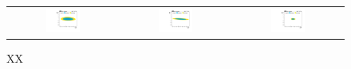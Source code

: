  \begin{figure}[tbh!]
 \begin{center}
 \begin{tabular}{ccc}
 \includegraphics[width=0.33\textwidth]{figures/Part4/Sensitivity/2dScan_emuetau}&
 \includegraphics[width=0.33\textwidth]{figures/Part4/Sensitivity/2dScan_emumutau}&
 \includegraphics[width=0.33\textwidth]{figures/Part4/Sensitivity/2dScan_etaumutau}\\
 \end{tabular}
 \caption{XX}
 \label{fig:2DScan}
 \end{center}
 \end{figure}